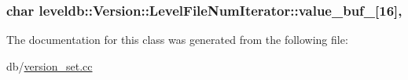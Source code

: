 \hypertarget{classleveldb_1_1_version_1_1_level_file_num_iterator_a7fa7916c314fcfcf0c20f1714c74b573}{
\subsubsection[{value\-\_\-buf\-\_\-}]{\setlength{\rightskip}{0pt plus 5cm}char leveldb\-::\-Version\-::\-Level\-File\-Num\-Iterator\-::value\-\_\-buf\-\_\-\mbox{[}16\mbox{]}\hspace{0.3cm}{\ttfamily [mutable]}, {\ttfamily [private]}}}\label{classleveldb_1_1_version_1_1_level_file_num_iterator_a7fa7916c314fcfcf0c20f1714c74b573}


The documentation for this class was generated from the following file\-:\begin{DoxyCompactItemize}
\item 
db/\hyperlink{version__set_8cc}{version\-\_\-set.\-cc}\end{DoxyCompactItemize}

